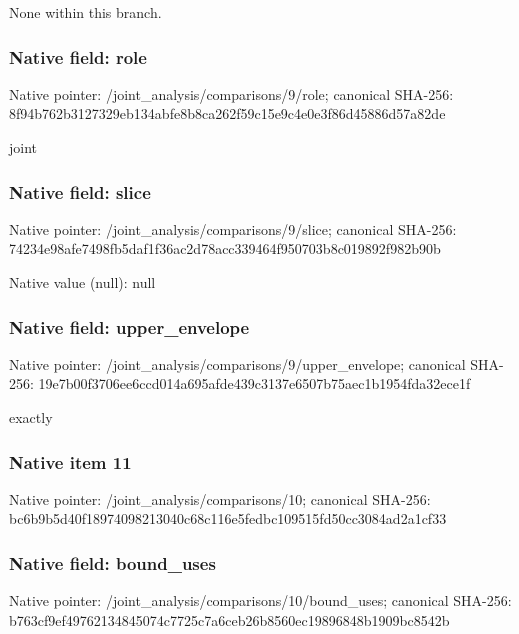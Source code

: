\documentclass[10pt,a4paper]{article}
\begin{document}
\begingroup\raggedright\sloppy None within this branch.\par\endgroup

\subsubsection{Native field: role}
Native pointer: /joint\_\allowbreak{}analysis/comparisons/9/role; canonical SHA-256: 8f94b762b3127329eb134abfe8b8ca262f59c15e9c4e0e3f86d45886d57a82de

\begingroup\raggedright\sloppy joint\par\endgroup

\subsubsection{Native field: slice}
Native pointer: /joint\_\allowbreak{}analysis/comparisons/9/slice; canonical SHA-256: 74234e98afe7498fb5daf1f36ac2d78acc339464f950703b8c019892f982b90b

Native value (null): null

\subsubsection{Native field: upper\_\allowbreak{}envelope}
Native pointer: /joint\_\allowbreak{}analysis/comparisons/9/upper\_\allowbreak{}envelope; canonical SHA-256: 19e7b00f3706ee6ccd014a695afde439c3137e6507b75aec1b1954fda32ece1f

\begingroup\raggedright{} exactly\par\endgroup

\subsubsection{Native item 11}
Native pointer: /joint\_\allowbreak{}analysis/comparisons/10; canonical SHA-256: bc6b9b5d40f18974098213040c68c116e5fedbc109515fd50cc3084ad2a1cf33

\subsubsection{Native field: bound\_\allowbreak{}uses}
Native pointer: /joint\_\allowbreak{}analysis/comparisons/10/bound\_\allowbreak{}uses; canonical SHA-256: b763cf9ef49762134845074c7725c7a6ceb26b8560ec19896848b1909bc8542b
\end{document}

